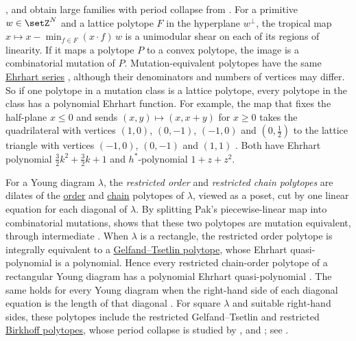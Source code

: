 ,  and 
obtain large families with period collapse from
\label{combinatorialMutation}.
For a primitive $w\in\setZ^N$ and a lattice polytope $F$ in the hyperplane
$w^{\perp}$, the tropical map
$x\mapsto x-\min_{f\in F}(x\cdot f)\,w$ is a unimodular shear on each of its
regions of linearity.  If it maps a polytope $P$ to a convex polytope, the
image is a combinatorial mutation of $P$.  Mutation-equivalent polytopes
have the same \hyperref[ehrhartSeries]{Ehrhart series}
\cite[Prop.~2.2]{ClarkeHigashitaniZaffalon2026}, although their denominators
and numbers of vertices may differ.  So if one polytope in a mutation class
is a lattice polytope, every polytope in the class has a polynomial Ehrhart
function.
For example, the map that fixes the half-plane $x\leq 0$ and sends
$(x,y)\mapsto(x,x+y)$ for $x\geq 0$ takes the quadrilateral with vertices
$(1,0)$, $(0,-1)$, $(-1,0)$ and $(0,\tfrac12)$ to the lattice triangle with
vertices $(-1,0)$, $(0,-1)$ and $(1,1)$ \cite[Ex.~1.1]{ClarkeHigashitaniZaffalon2026}.
Both have Ehrhart polynomial $\tfrac{3}{2}k^2+\tfrac{3}{2}k+1$ and
$h^*$-polynomial $1+z+z^2$.

For a Young diagram $\lambda$, the \emph{restricted order} and
\emph{restricted chain polytopes} are dilates of the
\hyperref[orderPolytope]{order} and \hyperref[chainPolytope]{chain}
polytopes of $\lambda$, viewed as a poset, cut by one linear equation for
each diagonal of $\lambda$.  By splitting Pak's piecewise-linear map into
combinatorial mutations, \cite[Thm.~3.1]{ClarkeHigashitaniZaffalon2026} shows that these
two polytopes are mutation equivalent, through intermediate
.  When $\lambda$ is a rectangle,
the restricted order polytope is integrally equivalent to a
\hyperref[gtpolytopes]{Gelfand--Tsetlin polytope}, whose Ehrhart
quasi-polynomial is a polynomial.  Hence every restricted chain-order
polytope of a rectangular Young diagram has a polynomial Ehrhart
quasi-polynomial \cite[Prop.~5.1 and Cor.~5.2]{ClarkeHigashitaniZaffalon2026}.
The same holds for every Young diagram when the right-hand side of each
diagonal equation is the length of that diagonal
\cite[Cor.~5.4]{ClarkeHigashitaniZaffalon2026}.
For square $\lambda$ and suitable right-hand sides, these polytopes include
the restricted Gelfand--Tsetlin and restricted
\hyperref[birkhoffPolytope]{Birkhoff polytopes}, whose period collapse is
studied by ,  and
 \cite{AlexanderssonHopkinsZaimi2023}; see
\cite[Rem.~2.9]{ClarkeHigashitaniZaffalon2026}.

